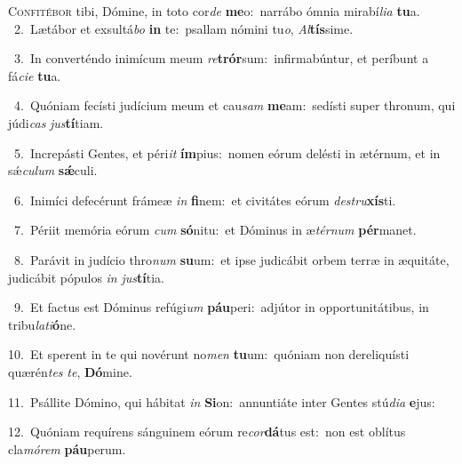 \lettrine{\initial\textcolor{\initialcolor}{C}}{onfitébor} tibi, Dómine, in toto cor\textit{de} \textbf{me}\-o:~\star narrábo ómnia mirabí\-\textit{li}\-\textit{a} \textbf{tu}\-a.\\
{\numbfont\textcolor{\numbcolor}{~2.}}~Lætábor et exsultá\textit{bo} \textbf{in} te:~\star psallam nómini tu\-\textit{o}\-, \textit{Al}\-\textbf{tís}sime.\par
{\numbfont\textcolor{\numbcolor}{~3.}}~In converténdo inimícum meum \textit{re}\-\textbf{trór}sum:~\star infirmabúntur, et períbunt a fá\-\textit{ci}\-\textit{e} \textbf{tu}\-a.\par
{\numbfont\textcolor{\numbcolor}{~4.}}~Quóniam fecísti judícium meum et cau\textit{sam} \textbf{me}\-am:~\star sedísti super thronum, qui júdi\textit{cas} \textit{jus}\-\textbf{tí}tiam.\par
{\numbfont\textcolor{\numbcolor}{~5.}}~Increpásti Gentes, et péri\textit{it} \textbf{ím}\-pius:~\star nomen eórum delésti in ætérnum, et in sǽ\-\textit{cu}\-\textit{lum} \textbf{sǽ}\-culi.\par
{\numbfont\textcolor{\numbcolor}{~6.}}~Inimíci defecérunt frámeæ \textit{in} \textbf{fi}\-nem:~\star et civitátes eórum \textit{de}\-\textit{stru}\textbf{xís}ti.\par
{\numbfont\textcolor{\numbcolor}{~7.}}~Périit memória eórum \textit{cum} \textbf{só}\-nitu:~\star et Dóminus in æ\-\textit{tér}\-\textit{num} \textbf{pér}\-manet.\par
{\numbfont\textcolor{\numbcolor}{~8.}}~Parávit in judício thro\textit{num} \textbf{su}\-um:~\star et ipse judicábit orbem terræ in æquitáte, judicábit pópulos \textit{in} \textit{jus}\-\textbf{tí}tia.\par
{\numbfont\textcolor{\numbcolor}{~9.}}~Et factus est Dóminus refúgi\textit{um} \textbf{páu}\-peri:~\star adjútor in opportunitátibus, in tribu\-\textit{la}\-\textit{ti}\textbf{ó}ne.\par
{\numbfont\textcolor{\numbcolor}{10.}}~Et sperent in te qui novérunt no\textit{men} \textbf{tu}\-um:~\star quóniam non dereliquísti quærén\textit{tes} \textit{te}\-, \textbf{Dó}\-mine.\par
{\numbfont\textcolor{\numbcolor}{11.}}~Psállite Dómino, qui hábitat \textit{in} \textbf{Si}\-on:~\star annuntiáte inter Gentes stú\-\textit{di}\-\textit{a} \textbf{e}\-jus:\par
{\numbfont\textcolor{\numbcolor}{12.}}~Quóniam requírens sánguinem eórum re\-\textit{cor}\-\textbf{dá}tus est:~\star non est oblítus cla\-\textit{mó}\-\textit{rem} \textbf{páu}\-perum.\par
